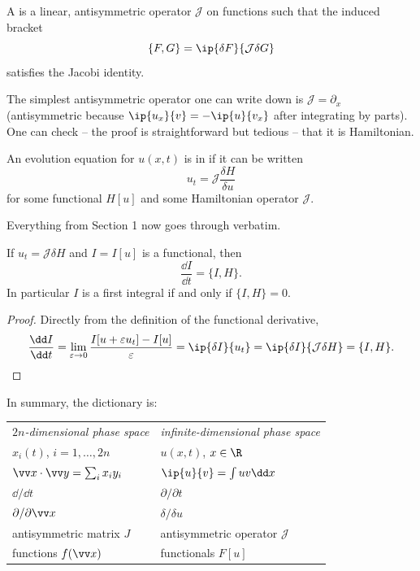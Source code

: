 \begin{definition}
	A  is a linear, antisymmetric operator $\mathcal J$ on functions such that the induced bracket
	$$
	\{F,G\} = \ip{\delta F}{\mathcal J\delta G}
	$$
	satisfies the Jacobi identity.
\end{definition}

The simplest antisymmetric operator one can write down is $\mathcal J = \partial_x$ (antisymmetric because $\ip{u_x}{v} = -\ip{u}{v_x}$ after integrating by parts). One can check -- the proof is straightforward but tedious -- that it is Hamiltonian.

\begin{definition}
	An evolution equation for $u(x,t)$ is in  if it can be written
	$$
	u_t = \mathcal J\frac{\delta H}{\delta u}
	$$
	for some functional $H[u]$ and some Hamiltonian operator $\mathcal J$.
\end{definition}

Everything from Section 1 now goes through verbatim.

\begin{proposition}
	If $u_t = \mathcal J\delta H$ and $I = I[u]$ is a functional, then
	$$
	\frac{\dd I}{\dd t} = \{I, H\}.
	$$
	In particular $I$ is a first integral if and only if $\{I, H\} = 0$.
\end{proposition}
\begin{proof}
	Directly from the definition of the functional derivative,
	$$
	\frac{\dd I}{\dd t} = \lim_{\varepsilon\to0}\frac{I[u+\varepsilon u_t] - I[u]}{\varepsilon} = \ip{\delta I}{u_t} = \ip{\delta I}{\mathcal J\delta H} = \{I, H\}. \qedhere
	$$
\end{proof}

In summary, the dictionary is:
\begin{center}
	\begin{tabular}{ll}
		\emph{$2n$-dimensional phase space} & \emph{infinite-dimensional phase space}\\[2pt]
		$x_i(t)$, $i = 1,\dots,2n$ & $u(x,t)$, $x\in\R$\\
		$\vv x\cdot\vv y = \sum_ix_iy_i$ & $\ip{u}{v} = \int u v\dd x$\\
		$\dd/\dd t$ & $\partial/\partial t$\\
		$\partial/\partial\vv x$ & $\delta/\delta u$\\
		antisymmetric matrix $J$ & antisymmetric operator $\mathcal J$\\
		functions $f(\vv x)$ & functionals $F[u]$\\
	\end{tabular}
\end{center}

